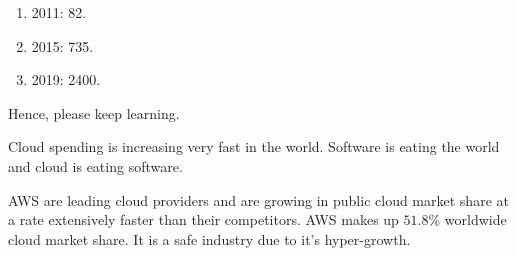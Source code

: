 \begin{enumerate}
	\item 2011: 82.
	\item 2015: 735.
	\item 2019: 2400.
\end{enumerate}

Hence, please keep learning.

Cloud spending is increasing very fast in the world. Software is eating the world and cloud is eating software.

AWS are leading cloud providers and are growing in public cloud market share at a rate extensively faster than their competitors. AWS makes up $51.8\%$ worldwide cloud market share. It is a safe industry due to it's hyper-growth.

